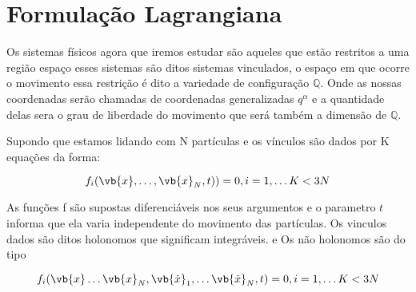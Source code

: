 \documentclass{article}
\begin{document}
\section{Formulação Lagrangiana}

Os sistemas físicos agora que iremos estudar são aqueles que estão restritos a uma região espaço esses sistemas são ditos sistemas vinculados, o espaço em que ocorre o movimento essa restrição é dito a variedade de configuração $\mathbb{Q}$. Onde as nossas coordenadas serão chamadas de coordenadas generalizadas $q^\alpha$ e a quantidade delas sera o grau de liberdade do movimento que será também a dimensão de $\mathbb{Q}$.

Supondo que estamos lidando com N partículas e os vínculos são dados por K equações da forma:

$$f_i(\vb{x}, \dots ,\vb{x}_N,t))=0 , i=1 , \dots K <3N$$


As funções f são supostas diferenciáveis nos seus argumentos e o parametro $t$ informa que ela varia independente do movimento das partículas. Os vinculos dados são ditos holonomos que significam integráveis. e Os não holonomos são do tipo

$$f_i(\vb{x} \dots \vb{x}_N,\vb{\dot{x}}_1,\dots\vb{\dot{x}}_N,t)=0 , i=1 , \dots K <3N$$
\end{document}
